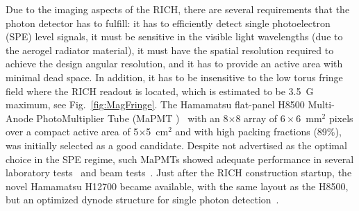 \documentclass[5p,times,twocolumn]{elsarticle}
\def\MaPMT{MaPMT }
\begin{document}
Due to the imaging aspects of the RICH, there are several requirements that the photon detector has to fulfill: it has
to efficiently detect single photoelectron (SPE) level signals, it must be sensitive in the visible light wavelengths (due
to the aerogel radiator material), it must have the spatial resolution required to achieve the design angular resolution,
and it has to provide an active area with minimal dead space. In addition, it has to be insensitive to the low torus fringe
field where the RICH readout is located, which is estimated to be 3.5~G maximum, see Fig.~\ref{fig:MagFringe}.
The Hamamatsu flat-panel H8500 Multi-Anode PhotoMultiplier Tube (\MaPMT)~\cite{Ref:H8500} with an 8$\times$8
array of $6 \times 6$~mm$^2$ pixels over a compact active area of 5$\times$5~cm$^2$ and with high packing
fractions (89\%), was initially selected as a good candidate.
Despite not advertised as the optimal choice in the SPE regime, such MaPMTs showed adequate performance in several
laboratory tests~\cite{MaPMT:test} and beam tests~\cite{RICH:CERN}.
Just after the RICH construction startup, the novel Hamamatsu H12700 became available, with the same layout as
the H8500, but an optimized dynode structure for single photon detection~\cite{Ref:H12700}.
\end{document}
